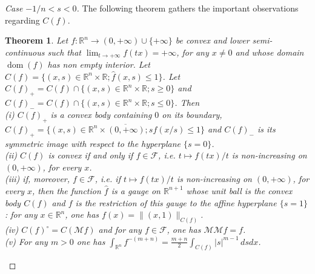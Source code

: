 \documentclass[10pt]{amsart}
\newtheorem{thm}{Theorem}[section]
\theoremstyle{definition}
\theoremstyle{remark}
\newcommand{\R}{\mathbb{R}}
\newcommand{\M}{\mathcal{M}}
\newcommand{\F}{\mathcal{F}}
\newcommand{\f}{\widehat{f}}
\newcommand{\dom}{\operatorname{dom}}
\begin{document}
\begin{proof}[Case $-1/n<s< 0$]
The following theorem gathers the important observations regarding $C(f)$.
\begin{thm}\label{thm:C(f)}
Let $f:\R^n\to(0,+\infty)\cup\{+\infty\}$ be convex and lower semi-continuous such that $\lim_{t\to+\infty}f(tx)=+\infty$, for any $x\neq0$ and whose domain $\dom(f)$ has non empty interior. Let $C(f)=\{(x,s)\in\R^n\times\R; \f(x,s)\le1\}$. Let $C(f)_+=C(f)\cap\{(x,s)\in\R^n\times\R; s\ge0\}$ and $C(f)_{-}=C(f)\cap\{(x,s)\in\R^n\times\R; s\le0\}$. Then \\
(i) $C(f)_+$ is a convex body containing $0$ on its boundary, $C(f)_+=\overline{\{(x,s)\in\R^n\times(0,+\infty);sf(x/s)\le1\}}$ and $C(f)_{-}$ is its symmetric image with respect to the hyperplane $\{s=0\}$.\\
(ii) $C(f)$ is convex if and only if $f\in\F$, \em{i.e.} $t\mapsto f(tx)/t$ is non-increasing on $(0,+\infty)$, for every $x$.\\
(iii) if, moreover, $f\in\F$, \em{i.e.} if $t\mapsto f(tx)/t$ is non-increasing on $(0,+\infty)$, for every $x$,  then the function $\f$ is a gauge on $\R^{n+1}$ whose unit ball is the convex body $C(f)$ and $f$ is the restriction of this gauge to the affine hyperplane $\{s=1\}$: for any $x\in\R^n$, one has $f(x)=\|(x,1)\|_{C(f)}$.\\
(iv) $C(f)^\circ=C(\M f)$ and for any $f\in\F$, one has $\M\M f=f$.\\
(v) For any $m>0$ one has $\int_{\R^n} f^{-(m+n)}=\frac{m+n}{2}\int_{C(f)}|s|^{m-1}\,dsdx$.
\end{thm}


\end{proof}
\end{document}
